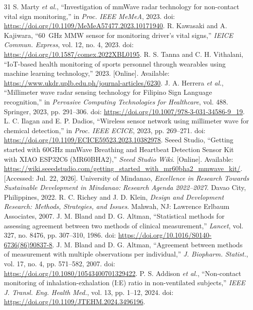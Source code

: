 \documentclass[10pt,conference]{IEEEtran}
\begin{document}
\begin{thebibliography}{31}
 S. Marty \textit{et al.}, ``Investigation of mmWave radar technology for non-contact vital sign monitoring,'' in \textit{Proc. IEEE MeMeA}, 2023. doi: \url{https://doi.org/10.1109/MeMeA57477.2023.10171940}.
 R. Kawasaki and A. Kajiwara, ``60~GHz MMW sensor for monitoring driver's vital signs,'' \textit{IEICE Commun. Express}, vol. 12, no. 4, 2023. doi: \url{https://doi.org/10.1587/comex.2022XBL0195}.
 R. S. Tanna and C. H. Vithalani, ``IoT-based health monitoring of sports personnel through wearables using machine learning technology,'' 2023. [Online]. Available: \url{https://www.ukdr.uplb.edu.ph/journal-articles/6230}.
 J. A. Herrera \textit{et al.}, ``Millimeter wave radar sensing technology for Filipino Sign Language recognition,'' in \textit{Pervasive Computing Technologies for Healthcare}, vol. 488. Springer, 2023, pp. 291--306. doi: \url{https://doi.org/10.1007/978-3-031-34586-9_19}.
 L. C. Ilagan and E. P. Dadios, ``Wireless sensor network using millimeter wave for chemical detection,'' in \textit{Proc. IEEE ECICE}, 2023, pp. 269--271. doi: \url{https://doi.org/10.1109/ECICE59523.2023.10382978}.
 Seeed Studio, ``Getting started with 60GHz mmWave Breathing and Heartbeat Detection Sensor Kit with XIAO ESP32C6 (MR60BHA2),'' \textit{Seeed Studio Wiki}. [Online]. Available: \url{https://wiki.seeedstudio.com/getting_started_with_mr60bha2_mmwave_kit/}. [Accessed: Jul. 22, 2026].
 University of Mindanao, \textit{Excellence in Research Towards Sustainable Development in Mindanao: Research Agenda 2022--2027}. Davao City, Philippines, 2022.
 R. C. Richey and J. D. Klein, \textit{Design and Development Research: Methods, Strategies, and Issues}. Mahwah, NJ: Lawrence Erlbaum Associates, 2007.
 J. M. Bland and D. G. Altman, ``Statistical methods for assessing agreement between two methods of clinical measurement,'' \textit{Lancet}, vol. 327, no. 8476, pp. 307--310, 1986. doi: \url{https://doi.org/10.1016/S0140-6736(86)90837-8}.
 J. M. Bland and D. G. Altman, ``Agreement between methods of measurement with multiple observations per individual,'' \textit{J. Biopharm. Statist.}, vol. 17, no. 4, pp. 571--582, 2007. doi: \url{https://doi.org/10.1080/10543400701329422}.
 P. S. Addison \textit{et al.}, ``Non-contact monitoring of inhalation-exhalation (I:E) ratio in non-ventilated subjects,'' \textit{IEEE J. Transl. Eng. Health Med.}, vol. 13, pp. 1--12, 2024. doi: \url{https://doi.org/10.1109/JTEHM.2024.3496196}.
\end{thebibliography}
\end{document}
